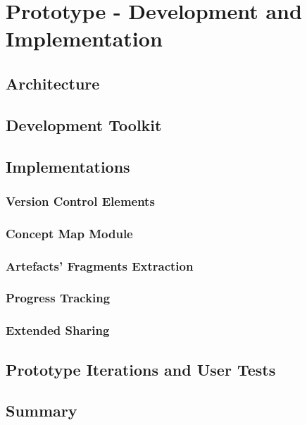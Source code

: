 \chapter{Prototype - Development and Implementation\label{cha:prototype}}

\section{Architecture}

\section{Development Toolkit}

\section{Implementations}

\subsection{Version Control Elements}

\subsection{Concept Map Module}
 
\subsection{Artefacts' Fragments Extraction}

\subsection{Progress Tracking}

\subsection{Extended Sharing}

\section{Prototype Iterations and User Tests}
 
\section{Summary}